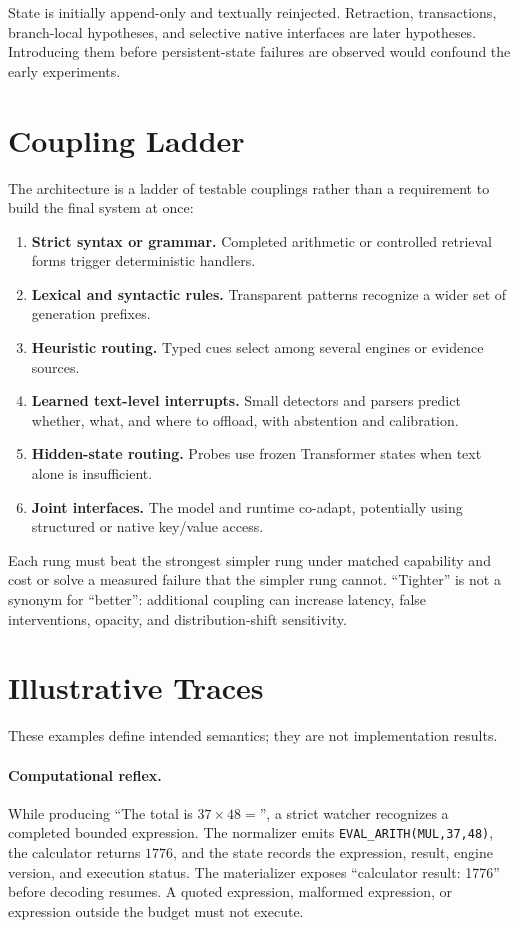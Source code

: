 \documentclass[11pt]{article}
\begin{document}
State is initially append-only and textually reinjected.  Retraction,
transactions, branch-local hypotheses, and selective native interfaces are
later hypotheses.  Introducing them before persistent-state failures are
observed would confound the early experiments.

\section{Coupling Ladder}

The architecture is a ladder of testable couplings rather than a requirement to
build the final system at once:
\begin{enumerate}
  \item \textbf{Strict syntax or grammar.} Completed arithmetic or controlled
  retrieval forms trigger deterministic handlers.
  \item \textbf{Lexical and syntactic rules.} Transparent patterns recognize a
  wider set of generation prefixes.
  \item \textbf{Heuristic routing.} Typed cues select among several engines or
  evidence sources.
  \item \textbf{Learned text-level interrupts.} Small detectors and parsers
  predict whether, what, and where to offload, with abstention and calibration.
  \item \textbf{Hidden-state routing.} Probes use frozen Transformer states when
  text alone is insufficient.
  \item \textbf{Joint interfaces.} The model and runtime co-adapt, potentially
  using structured or native key/value access.
\end{enumerate}

Each rung must beat the strongest simpler rung under matched capability and cost
or solve a measured failure that the simpler rung cannot.  ``Tighter'' is not a
synonym for ``better'': additional coupling can increase latency, false
interventions, opacity, and distribution-shift sensitivity.

\section{Illustrative Traces}

These examples define intended semantics; they are not implementation results.

\paragraph{Computational reflex.}
While producing ``The total is $37\times48=$'', a strict watcher recognizes a
completed bounded expression.  The normalizer emits
\texttt{EVAL\_ARITH(MUL,37,48)}, the calculator returns $1776$, and the state
records the expression, result, engine version, and execution status.  The
materializer exposes ``calculator result: 1776'' before decoding resumes.  A
quoted expression, malformed expression, or expression outside the budget must
not execute.
\end{document}
